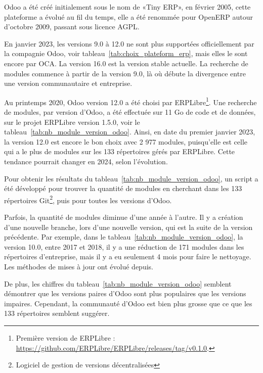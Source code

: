
Odoo a été créé initialement sous le nom de «Tiny ERP», en février 2005, cette plateforme a évolué au fil du temps, elle a été renommée pour OpenERP autour d'octobre 2009, passant sous licence AGPL.

En janvier 2023, les versions 9.0 à 12.0 ne sont plus supportées officiellement par la compagnie Odoo, voir tableau~\ref{tab:choix_plateform_erp}, mais elles le sont encore par OCA. La version 16.0 est la version stable actuelle. La recherche de modules commence à partir de la version 9.0, là où débute la divergence entre une version communautaire et entreprise.

Au printemps 2020, Odoo version 12.0 a été choisi par ERPLibre\footnote{Première version de ERPLibre : \url{https://github.com/ERPLibre/ERPLibre/releases/tag/v0.1.0}.}. Une recherche de modules, par version d'Odoo, a été effectuée sur 11 Go de code et de données, sur le projet ERPLibre version 1.5.0, voir le tableau~\ref{tab:nb_module_version_odoo}. Ainsi, en date du premier janvier 2023, la version 12.0 est encore le bon choix avec 2 977 modules, puisqu'elle est celle qui a le plus de modules sur les 133 répertoires gérés par ERPLibre. Cette tendance pourrait changer en 2024, selon l’évolution.

Pour obtenir les résultats du tableau~\ref{tab:nb_module_version_odoo}, un script a été développé pour trouver la quantité de modules en cherchant dans les 133 répertoires Git\footnote{Logiciel de gestion de versions décentralisées}, puis pour toutes les versions d'Odoo.

Parfois, la quantité de modules diminue d'une année à l'autre. Il y a création d'une nouvelle branche, lors d'une nouvelle version, qui est la suite de la version précédente. Par exemple, dans le tableau~\ref{tab:nb_module_version_odoo}, la version 10.0, entre 2017 et 2018, il y a une réduction de 171 modules dans les répertoires d'entreprise, mais il y a eu seulement 4 mois pour faire le nettoyage. Les méthodes de mises à jour ont évolué depuis.

De plus, les chiffres du tableau~\ref{tab:nb_module_version_odoo} semblent démontrer que les versions paires d'Odoo sont plus populaires que les versions impaires. Cependant, la communauté d'Odoo est bien plus grosse que ce que les 133 répertoires semblent suggérer.

